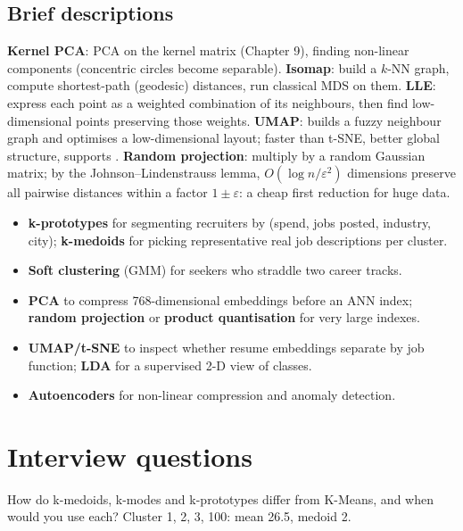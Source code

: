 \subsection{Brief descriptions}
\textbf{Kernel PCA}: PCA on the kernel matrix (Chapter 9), finding non-linear components (concentric circles become separable).
\textbf{Isomap}: build a $k$-NN graph, compute shortest-path (geodesic) distances, run classical MDS on them.
\textbf{LLE}: express each point as a weighted combination of its neighbours, then find low-dimensional points preserving those weights.
\textbf{UMAP}: builds a fuzzy neighbour graph and optimises a low-dimensional layout; faster than t-SNE, better global structure, supports .
\textbf{Random projection}: multiply by a random Gaussian matrix; by the Johnson--Lindenstrauss lemma, $O(\log n/\varepsilon^2)$ dimensions preserve all pairwise distances
within a factor $1\pm\varepsilon$: a cheap first reduction for huge data.

\begin{practical}
\begin{itemize}
\item \textbf{k-prototypes} for segmenting recruiters by (spend, jobs posted, industry, city); \textbf{k-medoids} for picking representative real job descriptions per cluster.
\item \textbf{Soft clustering} (GMM) for seekers who straddle two career tracks.
\item \textbf{PCA} to compress 768-dimensional embeddings before an ANN index; \textbf{random projection} or \textbf{product quantisation} for very large indexes.
\item \textbf{UMAP/t-SNE} to inspect whether resume embeddings separate by job function; \textbf{LDA} for a supervised 2-D view of classes.
\item \textbf{Autoencoders} for non-linear compression and anomaly detection.
\end{itemize}
\end{practical}

\section{Interview questions}

\begin{qa}{How do k-medoids, k-modes and k-prototypes differ from K-Means, and when would you use each?}
\worked Cluster 1, 2, 3, 100: mean 26.5, medoid 2.
\end{qa}

